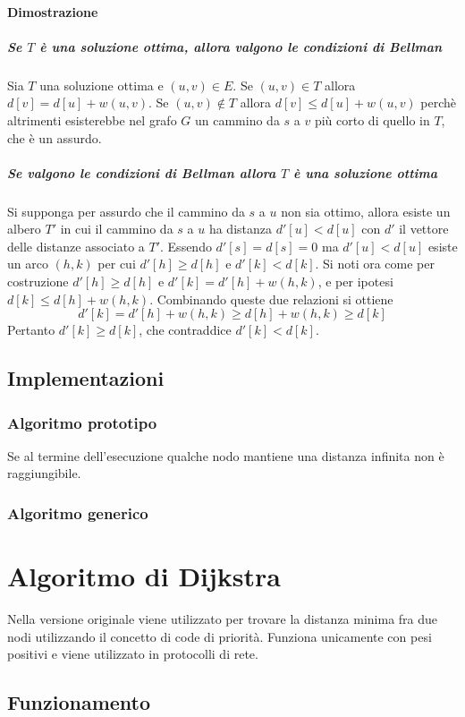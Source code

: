 \paragraph{Dimostrazione}
\subparagraph{Se $T$ \`e una soluzione ottima, allora valgono le condizioni di Bellman} Sia $T$ una soluzione ottima e $(u, v)\in E$. Se $(u, v)\in T$ allora $d[v]=d[u]+w(u, v)$. Se
$(u, v)\not\in T$ allora $d[v]\le d[u]+w(u, v)$ perch\`e altrimenti esisterebbe nel grafo $G$ un cammino da $s$ a $v$ pi\`u corto di quello in $T$, che \`e un assurdo.
\subparagraph{Se valgono le condizioni di Bellman allora $T$ \`e una soluzione ottima} Si supponga per assurdo che il cammino da $s$ a $u$ non sia ottimo, allora esiste un albero $T'$
in cui il cammino da $s$ a $u$ ha distanza $d'[u]<d[u]$ con $d'$ il vettore delle distanze associato a $T'$. Essendo $d'[s]=d[s]=0$ ma $d'[u]<d[u]$ esiste un arco $(h, k)$ per cui 
$d'[h]\ge d[h]$ e $d'[k]<d[k]$. Si noti ora come per costruzione $d'[h]\ge d[h]$ e $d'[k]=d'[h]+w(h, k)$, e per ipotesi $d[k]\le d[h]+w(h, k)$. Combinando queste due relazioni si ottiene
$$ d'[k] = d'[h]+w(h, k)\ge d[h]+w(h, k)\ge d[k]$$ Pertanto $d'[k]\ge d[k]$, che contraddice $d'[k]<d[k]$. 
\subsection{Implementazioni}
\subsubsection{Algoritmo prototipo}

Se al termine dell'esecuzione qualche nodo mantiene una distanza infinita non \`e raggiungibile.
\subsubsection{Algoritmo generico}



\section{Algoritmo di Dijkstra}
Nella versione originale viene utilizzato per trovare la distanza minima fra due nodi utilizzando il concetto di code di priorit\`a. Funziona unicamente con pesi positivi e viene 
utilizzato in protocolli di rete.
\subsection{Funzionamento}
